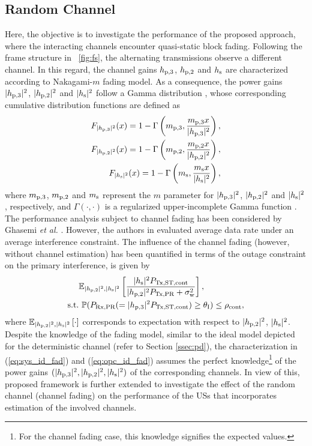 {\subsection{Random Channel}\label{ssec:ltpa}
Here, the objective is to investigate the performance of the proposed approach, where the interacting channels encounter quasi-static block fading. Following the frame structure in \figurename~\ref{fig:fs}, the alternating transmissions observe a different channel. In this regard, the channel gains $h_{\text{p,3}}$, $h_{\text{p,2}}$ and $h_{\text{s}}$ are characterized according to Nakagami-$m$ fading model. As a consequence, the power gains $|h_{\text{p,3}}|^2$, $|h_{\text{p,2}}|^2$ and $|h_{\text{s}}|^2$ follow a Gamma distribution \cite{Goldsmith05}, whose corresponding cumulative distribution functions are defined as  
\begin{align}
F_{|h_{\text{p,3}}|^2}(x) = 1 - \Gamma\left(m_{\text{p,3}}, \frac{m_{\text{p,3}} x}{|h_{\text{p,3}}|^2}\right), \label{eq:dis_phpth}\\
F_{|h_{\text{p,2}}|^2}(x) = 1 - \Gamma\left(m_{\text{p,2}}, \frac{m_{\text{p,2}} x}{|h_{\text{p,2}}|^2}\right), \label{eq:dis_pgpt}\\  
F_{|h_{\text{s}}|^2}(x) = 1 - \Gamma\left(m_{\text{s}} , \frac{m_{\text{s}} x}{|h_{\text{s}}|^2}\right), \label{eq:dis_pgs}
\end{align}
where $m_{\text{p,3}}$, $m_{\text{p,2}}$ and $m_{\text{s}}$ represent the $m$ parameter for $|h_{\text{p,3}}|^2$, $|h_{\text{p,2}}|^2$ and $|h_{\text{s}}|^2$, respectively, and $\Gamma(\cdot, \cdot)$ is a regularized upper-incomplete Gamma function \cite{abramo}. The performance analysis subject to channel fading has been considered by Ghasemi \textit{et al.} \cite{Ghasemi06, Ghasemi07}. However, the authors in \cite{Ghasemi06, Ghasemi07} evaluated average data rate under an average interference constraint. The influence of the channel fading (however, without channel estimation) has been quantified in terms of the outage constraint on the primary interference, is given by %
\begin{align}
	\quad & {\mathbb E}_{|h_{\text{p,2}}|^2, |h_{\text{s}}|^2 }\left[  \frac{|h_{\text{s}}|^2 P_{\text{Tx,ST,cont}}}{|h_{\text{p,2}}|^2 P_{\text{Tx,PR}} + \sigma^2_{\text{w}}} \right] \label{eq:sys_id_fad}, \\
	\text{s.t.} & \text{ } \mathbb P(P_{\text{Rx,PR}}(= |h_{\text{p,3}}|^2 P_{\text{Tx,ST,cont}}) \ge \theta_{\text{I}}) \le \rho_{\text{cont}}, \label{eq:opc_id_fad} 
\end{align}
where ${\mathbb E}_{|h_{\text{p,2}}|^2, |h_{\text{s}}|^2}\left[ \cdot \right]$ corresponds to expectation with respect to $|h_{\text{p,2}}|^2$, $|h_{\text{s}}|^2$.
Despite the knowledge of the fading model, similar to the ideal model depicted for the deterministic channel (refer to Section \ref{ssec:pd}), the characterization in (\ref{eq:sys_id_fad}) and (\ref{eq:opc_id_fad}) assumes the perfect knowledge\footnote{For the channel fading case, this knowledge signifies the expected values.} of the power gains $(|h_{\text{p,3}}|^2, |h_{\text{p,2}}|^2, |h_{\text{s}}|^2)$ of the corresponding channels. In view of this, proposed framework is further extended to investigate the effect of the random channel (channel fading) on the performance of the USs that incorporates estimation of the involved channels.

}
